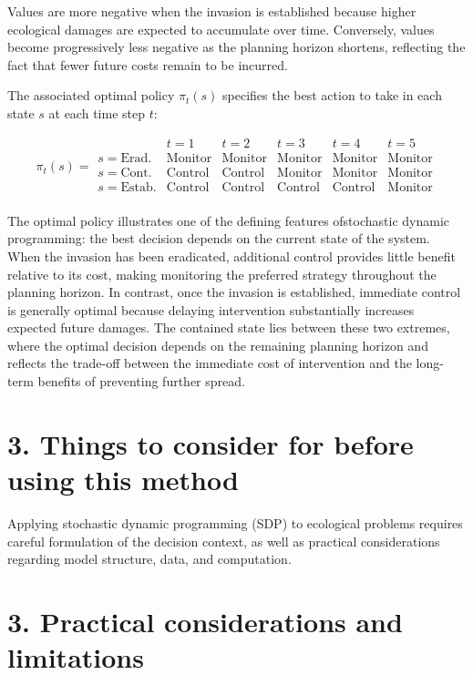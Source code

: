 \documentclass[
  11pt,
  a4paper,
]{article}
\begin{document}
Values are more negative when the invasion is established because higher ecological damages are expected to accumulate over time. Conversely, values become progressively less negative as the planning horizon shortens, reflecting the fact that fewer future costs remain to be incurred.

The associated optimal policy \(\pi_t(s)\) specifies the best action to take in each state \(s\) at each time step \(t\):

\[
\pi_t(s) =
\begin{array}{c|ccccc}
 & t=1 & t=2 & t=3 & t=4 & t=5 \\
\hline
s =\text{Erad.} & \text{Monitor} & \text{Monitor} & \text{Monitor} & \text{Monitor} & \text{Monitor} \\
s = \text{Cont.} & \text{Control} & \text{Control} & \text{Monitor} & \text{Monitor} & \text{Monitor} \\
s = \text{Estab.} & \text{Control} & \text{Control} & \text{Control} & \text{Control} & \text{Monitor} \\
\end{array}
\]

The optimal policy illustrates one of the defining features ofstochastic dynamic programming: the best decision depends on the current state of the system. When the invasion has been eradicated, additional control provides little benefit relative to its cost, making monitoring the preferred strategy throughout the planning horizon. In contrast, once the invasion is established, immediate control is generally optimal because delaying intervention substantially increases expected future damages. The contained state lies between these two extremes, where the optimal decision depends on the remaining planning horizon and reflects the trade-off between the immediate cost of intervention and the long-term benefits of preventing further spread.

\section{3. Things to consider for before using this method}\label{things-to-consider-for-before-using-this-method}

Applying stochastic dynamic programming (SDP) to ecological problems requires careful formulation of the decision context, as well as practical considerations regarding model structure, data, and computation.

\section{3. Practical considerations and limitations}\label{practical-considerations-and-limitations}
\end{document}
